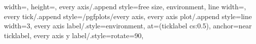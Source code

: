 \usepackage{pgfplots}
\pgfplotsset{compat=1.18}
\pgfplotsset
{
	width=\hsize,
	height=\hsize,
	every axis/.append style={free size, environment, line width=\fboxrule},
	every tick/.append style={/pgfplots/every axis},
	every axis plot/.append style={line width=3\fboxrule},
	every axis label/.style={environment, at={(ticklabel cs:0.5)}, anchor=near ticklabel},
	every axis y label/.style={rotate=90},
}